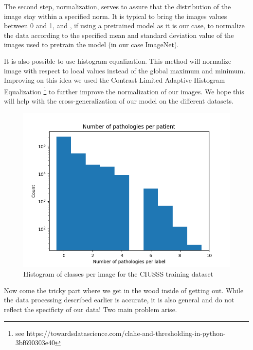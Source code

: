 \documentclass[11pt]{article}
\begin{document}
    The second step, normalization, serves to assure that the distribution of the image stay within a specified norm. It is typical
    to bring the images values between 0 and 1, and , if using a pretrained model as it is our case, to normalize the data
    according to the specified mean and standard deviation value of the images used to pretrain the model (in our case ImageNet).

    It is also possible to use histogram equalization. This method will normalize image with respect to local values instead of the global maximum and minimum.
    Improving on this idea we used the Contrast Limited Adaptive Histogram Equalization \footnote{see https://towardsdatascience.com/clahe-and-thresholding-in-python-3bf690303e40}
    to further improve the normalization of our images. We hope this will help with the cross-generalization of our model on the different datasets.


\begin{figure}

     \centering
     \includegraphics[width=\textwidth]{plots/disease_count_log}
     \caption{Histogram of classes per image for the CIUSSS training dataset}
     \label{fig:classes_per_image}

\end{figure}

    Now come the tricky part where we get in the wood inside of getting out. While the data processing described earlier
    is accurate, it is also general and do not reflect the specificty of our data! Two main problem arise.
\end{document}
